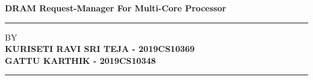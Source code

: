 \documentclass[12pt]{article}
\begin{document}
\begin{titlepage}
\begin{center}
    \LARGE\textbf{{DRAM Request-Manager For Multi-Core Processor}}\\
    \vspace{5cm}
   
    \hrule
     \vspace{1cm}
    \large{BY}\\
      \vspace{0.15cm}
    \Large\textbf{{KURISETI RAVI SRI TEJA - 2019CS10369}}\\
    \Large\textbf{{GATTU KARTHIK - 2019CS10348}}\\
      \vspace{1cm}
    \hrule
    
\end{center}


\end{titlepage}
\tableofcontents

\newpage
\end{document}

